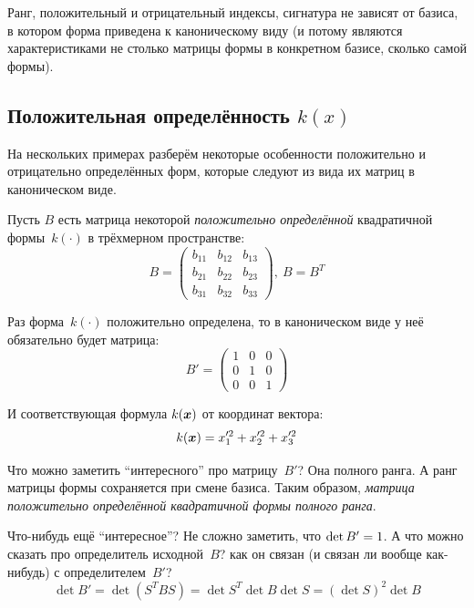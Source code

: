 \documentclass[a4paper,12pt]{article}
\begin{document}
  \begin{theorem}
    Ранг, положительный и отрицательный индексы, сигнатура не зависят от базиса, в котором форма приведена к каноническому виду (и потому являются характеристиками не столько матрицы формы в конкретном базисе, сколько самой формы).
  \end{theorem}
  
  
  \subsection{Положительная определённость $k(x)$}
  
  На нескольких примерах разберём некоторые особенности положительно и отрицательно определённых форм, которые следуют из вида их матриц в каноническом виде.
  
  \begin{example}
    Пусть $B$ есть матрица некоторой \emph{положительно определённой} квадратичной формы~$k(\cdot)$ в трёхмерном пространстве:
    \[
      B = \begin{pmatrix}
        b_{11} & b_{12} & b_{13}\\
        b_{21} & b_{22} & b_{23}\\
        b_{31} & b_{32} & b_{33}
      \end{pmatrix},\ B = B^T
    \]
    
    Раз форма~$k(\cdot)$ положительно определена, то в каноническом виде у неё обязательно будет матрица:
    \[
      B' = \begin{pmatrix}
        1 & 0 & 0\\
        0 & 1 & 0\\
        0 & 0 & 1
      \end{pmatrix}
    \]
    
    И соответствующая формула $k(\boldsymbol x)$ от координат вектора:
    \[
      k(\boldsymbol x) = x_1^{\prime 2} + x_2^{\prime 2} + x_3^{\prime 2}
    \]
    
    Что можно заметить ``интересного'' про матрицу~$B'$?
    Она полного ранга.
    А ранг матрицы формы сохраняется при смене базиса.
    Таким образом, \emph{матрица положительно определённой квадратичной формы полного ранга}.
    
    Что-нибудь ещё ``интересное''?
    Не сложно заметить, что $\det B' \hm= 1$.
    А что можно сказать про определитель исходной~$B$?
    как он связан (и связан ли вообще как-нибудь) с определителем~$B'$?
    \[
      \det B' = \det (S^T B S) = \det S^T \det B \det S = (\det S)^2 \det B
    \]
    

\end{example}
\end{document}
